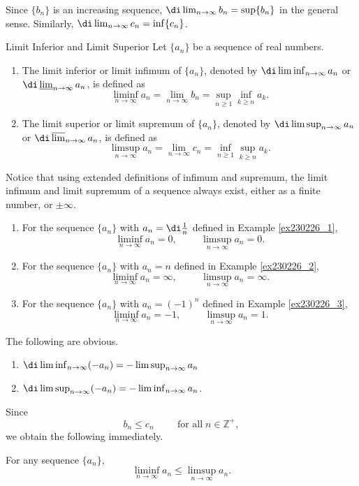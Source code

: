 Since $\{b_n\}$ is an increasing sequence, $\di\lim_{n\to \infty}b_n=\sup\{b_n\}$ in the general sense.  Similarly, $\di\lim_{n\to \infty}c_n=\inf\{c_n\}$. 
\begin{definition}{Limit Inferior and Limit Superior}
Let $\{a_n\}$ be a sequence of real numbers.
\begin{enumerate}
[1.]\item The limit inferior or limit infimum of $\{a_n\}$, denoted by $\di\liminf_{n\to\infty}a_n$ or $\di\varliminf_{n\to\infty}a_n$, is defined as
\[\liminf_{n\to\infty}a_n=\lim_{n\to \infty}b_n=\sup_{n\geq 1}\inf_{k\geq n}a_k.\]
\item The limit superior or limit supremum of $\{a_n\}$, denoted by $\di\limsup_{n\to\infty}a_n$ or $\di\varlimsup_{n\to\infty}a_n$, is defined as
\[\limsup_{n\to\infty}a_n=\lim_{n\to \infty} c_n=\inf_{n\geq 1}\sup_{k\geq n}a_k.\]
\end{enumerate}
\end{definition}


Notice that using extended definitions of infimum and supremum, the limit infimum and limit supremum of a sequence always exist, either as a finite number, or $\pm \infty$.

 
\begin{example}{}
\begin{enumerate}[1.]
\item
For the sequence $\{a_n\}$ with $a_n=\di\frac{1}{n}$ defined in Example \ref{ex230226_1},
\[\liminf_{n\to\infty}a_n=0,\hspace{1cm} \limsup_{n\to\infty}a_n=0.\]
\item
For the sequence $\{a_n\}$ with $a_n=n$ defined in Example \ref{ex230226_2},
\[\liminf_{n\to\infty}a_n=\infty, \hspace{1cm} \limsup_{n\to\infty}a_n=\infty.\]
\item
For the sequence $\{a_n\}$ with $a_n=(-1)^n$ defined in Example \ref{ex230226_3},
\[\liminf_{n\to\infty}a_n=-1,\hspace{1cm} \limsup_{n\to\infty}a_n=1.\]
\end{enumerate}
\end{example}
The following are obvious.
\begin{highlight}{}
\begin{enumerate}[1.]\item
$\di \liminf_{n\to\infty}(-a_n)=-\limsup_{n\to\infty}a_n$
\item $\di\limsup_{n\to\infty}(-a_n)=-\liminf_{n\to\infty}a_n$.
\end{enumerate}
\end{highlight}
Since \[b_n\leq c_n\hspace{1cm}\text{for all}\;n\in\mathbb{Z}^+,\]we obtain the following immediately.
\begin{proposition}[label=230227_21]{}
For any sequence $\{a_n\}$,
\[\liminf_{n\to \infty}a_n\leq \limsup_{n\to\infty}a_n.\]
\end{proposition}


